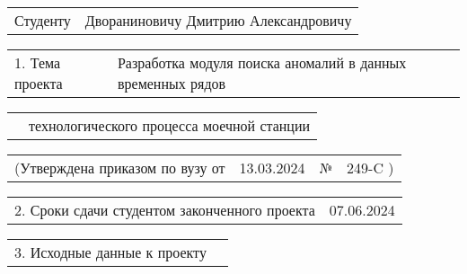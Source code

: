 \documentclass[12pt, А4, twoside]{article}
\begin{document}
	\begin{FlushLeft}
		\fontsize{12}{0}
		
		\begin{tabular}{p{1.9cm} p{14.95cm}}
			\textsf{Студенту} &
			\textsf{Двораниновичу Дмитрию Александровичу} \vspace{0pt} \hline
		\end{tabular}
		
		\vspace{-0.1 cm}
		
		\begin{tabular}{p{2.8cm} p{14.05cm}}
			\textsf{1. Тема проекта} &
			\textsf{Разработка модуля поиска аномалий в данных временных рядов} \vspace{0pt} \hline
		\end{tabular}
		
		\vspace{-0.1 cm}
		
		\begin{tabular}{p{2.8cm} p{14.05cm}}
			& \textsf{технологического процесса моечной станции} \vspace{0pt} \hline
		\end{tabular}
		
		\vspace{-0.1 cm}
		
		\begin{tabular}{p{5.9cm} p{4.8cm} p{0.3cm} p{5.0cm}}
			\textsf{(Утверждена приказом по вузу от} &
			\centering \textsf{13.03.2024} \vspace{1pt} \hline &
			\centering \textsf{№} &
			\centering \textsf{249-C \hspace{0.5cm} )} \hline
		\end{tabular}
		
		\vspace{-0.1 cm}
		
		\begin{tabular}{p{9.4cm} p{7.45cm}}
			\textsf{2. Сроки сдачи студентом законченного проекта} &
			\centering \textsf{07.06.2024} \vspace{1pt} \hline
		\end{tabular}
		
		\vspace{-0.1 cm}
		
		\begin{tabular}{p{5.7cm} p{11.15cm}}
			\textsf{3. Исходные данные к проекту} &
			\vspace{1pt} \hline
		\end{tabular}
		

\end{FlushLeft}
\end{document}
